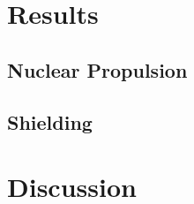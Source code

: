 \documentclass[12pt,a4paper]{report}
\begin{document}
\chapter{Results}

\section{Nuclear Propulsion}
\section{Shielding}


\chapter{Discussion}





\end{document}
